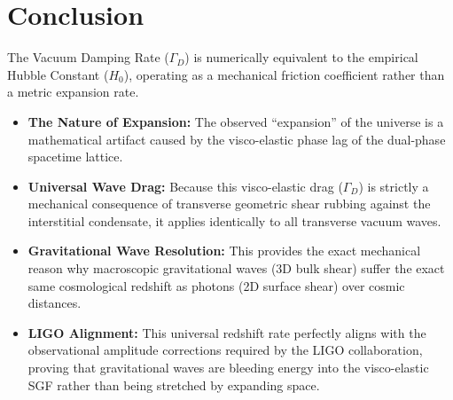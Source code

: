 \section{Conclusion}
The Vacuum Damping Rate ($\Gamma_D$) is numerically equivalent to the empirical Hubble Constant ($H_0$), operating as a mechanical friction coefficient rather than a metric expansion rate.

\begin{itemize}
    \item \textbf{The Nature of Expansion:} The observed ``expansion'' of the universe is a mathematical artifact caused by the visco-elastic phase lag of the dual-phase spacetime lattice.
    
    \item \textbf{Universal Wave Drag:} Because this visco-elastic drag ($\Gamma_D$) is strictly a mechanical consequence of transverse geometric shear rubbing against the interstitial condensate, it applies identically to all transverse vacuum waves.
    
    \item \textbf{Gravitational Wave Resolution:} This provides the exact mechanical reason why macroscopic gravitational waves (3D bulk shear) suffer the exact same cosmological redshift as photons (2D surface shear) over cosmic distances.
    
    \item \textbf{LIGO Alignment:} This universal redshift rate perfectly aligns with the observational amplitude corrections required by the LIGO collaboration, proving that gravitational waves are bleeding energy into the visco-elastic SGF rather than being stretched by expanding space.
\end{itemize}